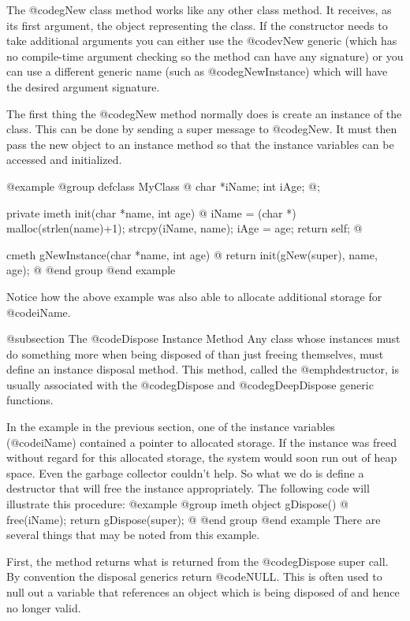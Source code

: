 The @code{gNew} class method works like any other class method.  It
receives, as its first argument, the object representing the class.
If the constructor needs to take additional arguments you can either
use the @code{vNew} generic (which has no compile-time argument checking
so the method can have any signature) or you can use a different generic name
(such as @code{gNewInstance}) which will have the desired argument
signature.

The first thing the @code{gNew} method normally does is create an
instance of the class.  This can be done by sending a super message to
@code{gNew}.  It must then pass the new object to an instance method
so that the instance variables can be accessed and initialized.

@example
@group
defclass  MyClass  @{
        char    *iName;
        int     iAge;
@};

private imeth  init(char *name, int age)
@{
        iName = (char *) malloc(strlen(name)+1);
        strcpy(iName, name);
        iAge = age;
        return self;
@}

cmeth  gNewInstance(char *name, int age)
@{
        return init(gNew(super), name, age);
@}
@end group
@end example

Notice how the above example was also able to allocate additional storage
for @code{iName}.


@subsection The @code{Dispose} Instance Method
Any class whose instances must do something more when being disposed of
than just freeing themselves, must define an instance disposal method.
This method, called the @emph{destructor}, is usually associated with
the @code{gDispose} and @code{gDeepDispose} generic functions.

In the example in the previous section, one of the instance variables
(@code{iName}) contained a pointer to allocated storage.  If the instance
was freed without regard for this allocated storage, the system would
soon run out of heap space.  Even the garbage collector couldn't help.
So what we do is define a destructor that will free the instance
appropriately.  The following code will illustrate this procedure:
@example
@group
imeth   object    gDispose()
@{
        free(iName);
        return gDispose(super);
@}
@end group
@end example
There are several things that may be noted from this example.

First, the method returns what is returned from the @code{gDispose}
super call.   By convention the disposal generics return @code{NULL}.
This is often used to null out a variable that references an object
which is being disposed of and hence no longer valid.

